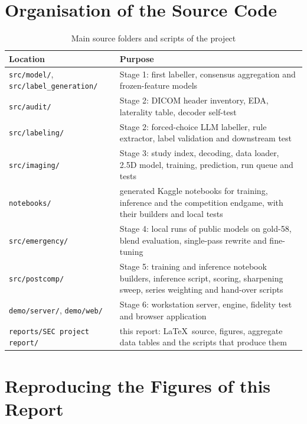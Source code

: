 \section{Organisation of the Source Code}

\begin{table}[H]
\centering\footnotesize{}
\caption{Main source folders and scripts of the project}
\label{tab:code}
\begin{tabularx}{\textwidth}{L{5.0cm} Y}
\toprule
Location & Purpose \\
\midrule
\texttt{src/model/}, \texttt{src/label\_generation/} & Stage 1: first labeller, consensus aggregation and frozen-feature models \\
\texttt{src/audit/} & Stage 2: DICOM header inventory, EDA, laterality table, decoder self-test \\
\texttt{src/labeling/} & Stage 2: forced-choice LLM labeller, rule extractor, label validation and downstream test \\
\texttt{src/imaging/} & Stage 3: study index, decoding, data loader, 2.5D model, training, prediction, run queue and tests \\
\texttt{notebooks/} & generated Kaggle notebooks for training, inference and the competition endgame, with their builders and local tests \\
\texttt{src/emergency/} & Stage 4: local runs of public models on gold-58, blend evaluation, single-pass rewrite and fine-tuning \\
\texttt{src/postcomp/} & Stage 5: training and inference notebook builders, inference script, scoring, sharpening sweep, series weighting and hand-over scripts \\
\texttt{demo/server/}, \texttt{demo/web/} & Stage 6: workstation server, engine, fidelity test and browser application \\
\texttt{reports/SEC project report/} & this report: \LaTeX\ source, figures, aggregate data tables and the scripts that produce them \\
\bottomrule
\end{tabularx}
\end{table}

\section{Reproducing the Figures of this Report}

